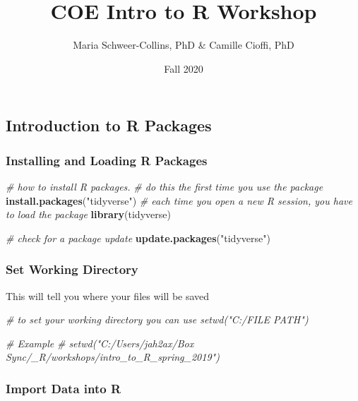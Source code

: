 \documentclass[
]{article}
\title{COE Intro to R Workshop}
\author{Maria Schweer-Collins, PhD \& Camille Cioffi, PhD}
\date{Fall 2020}
\newenvironment{Shaded}{\begin{snugshade}}{\end{snugshade}}
\newcommand{\CommentTok}[1]{\textcolor[rgb]{0.56,0.35,0.01}{\textit{#1}}}
\newcommand{\KeywordTok}[1]{\textcolor[rgb]{0.13,0.29,0.53}{\textbf{#1}}}
\newcommand{\NormalTok}[1]{#1}
\newcommand{\StringTok}[1]{\textcolor[rgb]{0.31,0.60,0.02}{#1}}
\begin{document}
\maketitle

\hypertarget{introduction-to-r-packages}{%
\subsection{Introduction to R
Packages}\label{introduction-to-r-packages}}

\hypertarget{installing-and-loading-r-packages}{%
\subsubsection{Installing and Loading R
Packages}\label{installing-and-loading-r-packages}}

\begin{Shaded}
\begin{Highlighting}[]
\CommentTok{# how to install R packages.}
\CommentTok{# do this the first time you use the package}
\KeywordTok{install.packages}\NormalTok{(}\StringTok{"tidyverse"}\NormalTok{)}
\CommentTok{# each time you open a new R session, you have to load the package}
\KeywordTok{library}\NormalTok{(tidyverse)}

\CommentTok{# check for a package update}
\KeywordTok{update.packages}\NormalTok{(}\StringTok{"tidyverse"}\NormalTok{)}
\end{Highlighting}
\end{Shaded}

\hypertarget{set-working-directory}{%
\subsubsection{Set Working Directory}\label{set-working-directory}}

This will tell you where your files will be saved

\begin{Shaded}
\begin{Highlighting}[]
\CommentTok{# to set your working directory you can use setwd("C:/FILE PATH")}

\CommentTok{# Example}
\CommentTok{# setwd("C:/Users/jah2ax/Box Sync/_R/workshops/intro_to_R_spring_2019")}
\end{Highlighting}
\end{Shaded}

\hypertarget{import-data-into-r}{%
\subsubsection{Import Data into R}\label{import-data-into-r}}
\end{document}
